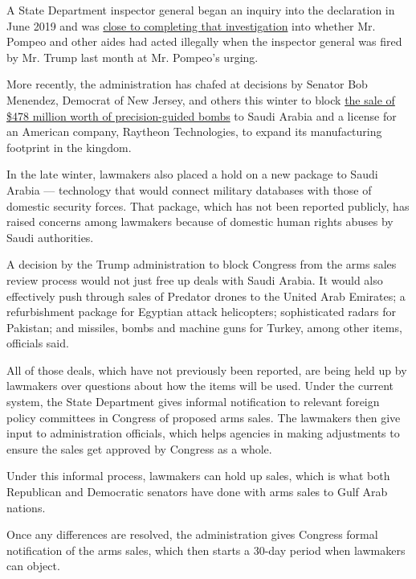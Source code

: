 A State Department inspector general began an inquiry into the
declaration in June 2019 and was
\href{https://www.nytimes.com/2020/05/18/us/politics/pompeo-trump-linick-inspector-general-firing.html}{close
to completing that investigation} into whether Mr. Pompeo and other
aides had acted illegally when the inspector general was fired by Mr.
Trump last month at Mr. Pompeo's urging.

More recently, the administration has chafed at decisions by Senator Bob
Menendez, Democrat of New Jersey, and others this winter to block
\href{https://www.nytimes.com/2020/05/28/us/politics/congress-saudi-arabia-arms-sales.html}{the
sale of \$478 million worth of precision-guided bombs} to Saudi Arabia
and a license for an American company, Raytheon Technologies, to expand
its manufacturing footprint in the kingdom.

In the late winter, lawmakers also placed a hold on a new package to
Saudi Arabia --- technology that would connect military databases with
those of domestic security forces. That package, which has not been
reported publicly, has raised concerns among lawmakers because of
domestic human rights abuses by Saudi authorities.

A decision by the Trump administration to block Congress from the arms
sales review process would not just free up deals with Saudi Arabia. It
would also effectively push through sales of Predator drones to the
United Arab Emirates; a refurbishment package for Egyptian attack
helicopters; sophisticated radars for Pakistan; and missiles, bombs and
machine guns for Turkey, among other items, officials said.

All of those deals, which have not previously been reported, are being
held up by lawmakers over questions about how the items will be used.
Under the current system, the State Department gives informal
notification to relevant foreign policy committees in Congress of
proposed arms sales. The lawmakers then give input to administration
officials, which helps agencies in making adjustments to ensure the
sales get approved by Congress as a whole.

Under this informal process, lawmakers can hold up sales, which is what
both Republican and Democratic senators have done with arms sales to
Gulf Arab nations.

Once any differences are resolved, the administration gives Congress
formal notification of the arms sales, which then starts a 30-day period
when lawmakers can object.

